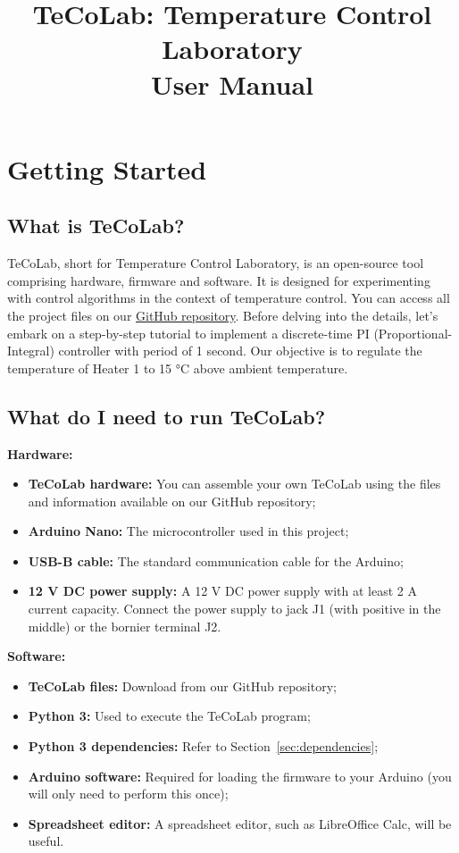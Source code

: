 \documentclass[12pt]{report}
\title{TeCoLab: Temperature Control Laboratory \\ User Manual}
\date{}
\begin{document}
\maketitle
\tableofcontents

\chapter{Getting Started}\label{chap:getstarted}

\section{What is TeCoLab?}\label{sec:WhatIsTecolab}

TeCoLab, short for Temperature Control Laboratory, is an open-source tool comprising hardware, firmware and software. It is designed for experimenting with control algorithms in the context of temperature control. You can access all the project files on our \href{https://github.com/ytcsc/TeCoLab/tree/main}{GitHub repository}. Before delving into the details, let's embark on a step-by-step tutorial to implement a discrete-time PI (Proportional-Integral) controller with period of 1 second. Our objective is to regulate the temperature of Heater 1 to 15 °C above ambient temperature.

\section{What do I need to run TeCoLab?}

\noindent \textbf{Hardware:}
\begin{itemize}
    \item \textbf{TeCoLab hardware:} You can assemble your own TeCoLab using the files and information available on our GitHub repository;
    \item \textbf{Arduino Nano:} The microcontroller used in this project;
    \item \textbf{USB-B cable:} The standard communication cable for the Arduino;
    \item \textbf{12 V DC power supply:} A 12 V DC power supply with at least 2 A current capacity. Connect the power supply to jack J1 (with positive in the middle) or the bornier terminal J2.
\end{itemize}

\noindent \textbf{Software:}
\begin{itemize}
    \item \textbf{TeCoLab files:} Download from our GitHub repository;
    \item \textbf{Python 3:} Used to execute the TeCoLab program;
    \item \textbf{Python 3 dependencies:} Refer to Section~\ref{sec:dependencies};
    \item \textbf{Arduino software:} Required for loading the firmware to your Arduino (you will only need to perform this once);
    \item \textbf{Spreadsheet editor:} A spreadsheet editor, such as LibreOffice Calc, will be useful.
\end{itemize}
\end{document}
